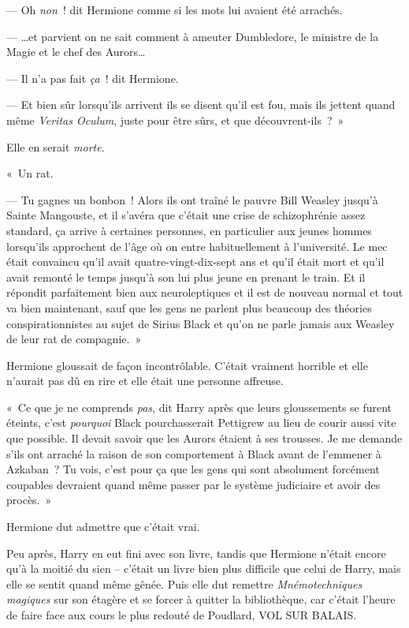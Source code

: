 --- Oh \emph{non}~! dit Hermione comme si les mots lui avaient été arrachés.

--- …et parvient on ne sait comment à ameuter Dumbledore, le ministre de la Magie et le chef des Aurors…

--- Il n'a pas fait \emph{ça}~! dit Hermione.

--- Et bien sûr lorsqu'ils arrivent ils se disent qu'il est fou, mais ils jettent quand même \emph{Veritas Oculum}, juste pour être sûrs, et que découvrent-ils~?~»

Elle en serait \emph{morte}.

«~Un rat.

--- Tu gagnes un bonbon~! Alors ils ont traîné le pauvre Bill Weasley jusqu'à Sainte Mangouste, et il s'avéra que c'était une crise de schizophrénie assez standard, ça arrive à certaines personnes, en particulier aux jeunes hommes lorsqu'ils approchent de l'âge où on entre habituellement à l'université. Le mec était convaincu qu'il avait quatre-vingt-dix-sept ans et qu'il était mort et qu'il avait remonté le temps jusqu'à son lui plus jeune en prenant le train. Et il répondit parfaitement bien aux neuroleptiques et il est de nouveau normal et tout va bien maintenant, sauf que les gens ne parlent plus beaucoup des théories conspirationnistes au sujet de Sirius Black et qu'on ne parle jamais aux Weasley de leur rat de compagnie.~»

Hermione gloussait de façon incontrôlable. C'était vraiment horrible et elle n'aurait pas dû en rire et elle était une personne affreuse.

«~Ce que je ne comprends \emph{pas}, dit Harry après que leurs gloussements se furent éteints, c'est \emph{pourquoi} Black pourchasserait Pettigrew au lieu de courir aussi vite que possible. Il devait savoir que les Aurors étaient à ses trousses. Je me demande s'ils ont arraché la raison de son comportement à Black avant de l'emmener à Azkaban~? Tu vois, c'est pour ça que les gens qui sont absolument forcément coupables devraient quand même passer par le système judiciaire et avoir des procès.~»

Hermione dut admettre que c'était vrai.

Peu après, Harry en eut fini avec son livre, tandis que Hermione n'était encore qu'à la moitié du sien -- c'était un livre bien plus difficile que celui de Harry, mais elle se sentit quand même gênée. Puis elle dut remettre \emph{Mnémotechniques magiques} sur son étagère et se forcer à quitter la bibliothèque, car c'était l'heure de faire face aux cours le plus redouté de Poudlard, VOL SUR BALAIS.

